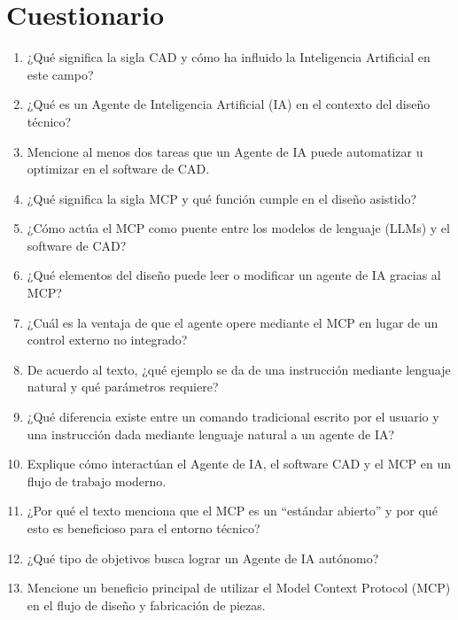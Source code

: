 \documentclass[../main]{subfiles}
\begin{document}
\section{Cuestionario}
\begin{enumerate}
  \item ¿Qué significa la sigla CAD y cómo ha influido la Inteligencia Artificial en este campo?
  \item ¿Qué es un Agente de Inteligencia Artificial (IA) en el contexto del diseño técnico?
  \item Mencione al menos dos tareas que un Agente de IA puede automatizar u optimizar en el software de CAD.
  \item ¿Qué significa la sigla MCP y qué función cumple en el diseño asistido?
  \item ¿Cómo actúa el MCP como puente entre los modelos de lenguaje (LLMs) y el software de CAD?
  \item ¿Qué elementos del diseño puede leer o modificar un agente de IA gracias al MCP?
  \item ¿Cuál es la ventaja de que el agente opere mediante el MCP en lugar de un control externo no integrado?
  \item De acuerdo al texto, ¿qué ejemplo se da de una instrucción mediante lenguaje natural y qué parámetros requiere?
  \item ¿Qué diferencia existe entre un comando tradicional escrito por el usuario y una instrucción dada mediante lenguaje natural a un agente de IA?
  \item Explique cómo interactúan el Agente de IA, el software CAD y el MCP en un flujo de trabajo moderno.
  \item ¿Por qué el texto menciona que el MCP es un ``estándar abierto'' y por qué esto es beneficioso para el entorno técnico?
  \item ¿Qué tipo de objetivos busca lograr un Agente de IA autónomo?
  \item Mencione un beneficio principal de utilizar el Model Context Protocol (MCP) en el flujo de diseño y fabricación de piezas.
\end{enumerate}
\end{document}
